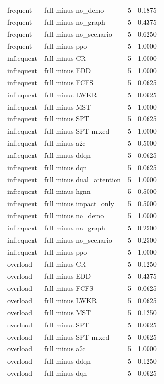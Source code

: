 \begin{tabular}{llll}
frequent & full minus no\_demo & 5 & 0.1875\\
frequent & full minus no\_graph & 5 & 0.4375\\
frequent & full minus no\_scenario & 5 & 0.6250\\
frequent & full minus ppo & 5 & 1.0000\\
infrequent & full minus CR & 5 & 1.0000\\
infrequent & full minus EDD & 5 & 1.0000\\
infrequent & full minus FCFS & 5 & 0.0625\\
infrequent & full minus LWKR & 5 & 0.0625\\
infrequent & full minus MST & 5 & 1.0000\\
infrequent & full minus SPT & 5 & 0.0625\\
infrequent & full minus SPT-mixed & 5 & 1.0000\\
infrequent & full minus a2c & 5 & 0.5000\\
infrequent & full minus ddqn & 5 & 0.0625\\
infrequent & full minus dqn & 5 & 0.0625\\
infrequent & full minus dual\_attention & 5 & 1.0000\\
infrequent & full minus hgnn & 5 & 0.5000\\
infrequent & full minus impact\_only & 5 & 0.5000\\
infrequent & full minus no\_demo & 5 & 1.0000\\
infrequent & full minus no\_graph & 5 & 0.2500\\
infrequent & full minus no\_scenario & 5 & 0.2500\\
infrequent & full minus ppo & 5 & 1.0000\\
overload & full minus CR & 5 & 0.1250\\
overload & full minus EDD & 5 & 0.4375\\
overload & full minus FCFS & 5 & 0.0625\\
overload & full minus LWKR & 5 & 0.0625\\
overload & full minus MST & 5 & 0.1250\\
overload & full minus SPT & 5 & 0.0625\\
overload & full minus SPT-mixed & 5 & 0.0625\\
overload & full minus a2c & 5 & 1.0000\\
overload & full minus ddqn & 5 & 0.1250\\
overload & full minus dqn & 5 & 0.0625\\

\end{tabular}
